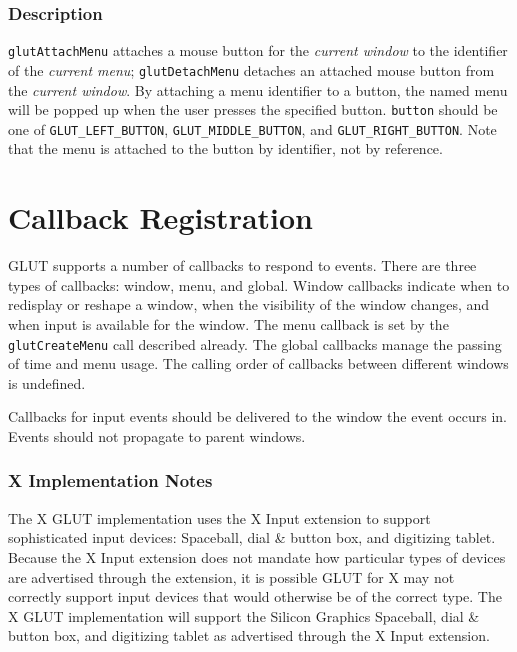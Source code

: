 \subsubsection*{Description}

{\tt glutAttachMenu} attaches a mouse button for the {\em current window} to the identifier of
the {\em current menu}; {\tt glutDetachMenu} detaches an attached mouse button from the
{\em current window}.  By attaching a menu identifier to a button, the named menu
will be popped up when the user presses the specified button.
{\tt button} should be one of {\tt GLUT\_LEFT\_BUTTON}, {\tt GLUT\_MIDDLE\_BUTTON},
and {\tt GLUT\_RIGHT\_BUTTON}.  Note that the menu is attached to the button by
identifier, not by reference.

\section{Callback Registration}

GLUT supports a number of callbacks to respond to events.  There are
three types of callbacks:  window, menu, and global.   Window callbacks
indicate when to redisplay or reshape a window, when the visibility of
the window changes, and when input is available for the window.
The menu callback is set by the {\tt glutCreateMenu} call described already.
The global callbacks manage the passing of time and menu usage.
The calling order of callbacks between different windows is undefined.

Callbacks for input events should be delivered to the window the event
occurs in.  Events should not propagate to parent windows.

\subsubsection*{X Implementation Notes}

The X GLUT implementation uses the X Input extension \cite{xinput-lib,xinput-protocol}
to support sophisticated input devices:  Spaceball, dial \& button box,
and digitizing tablet.  Because the X Input extension does not
mandate how particular types of devices are advertised through
the extension, it is possible GLUT for X may not
correctly support input devices that would otherwise be of the
correct type.  The X GLUT implementation will support the Silicon
Graphics Spaceball, dial \& button box, and digitizing tablet as
advertised through the X Input extension.


